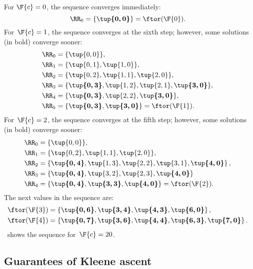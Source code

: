 \noindent For $\F{c}=0$, the sequence converges immediately:
\begin{equation*}
    \RR_{0}=\{\boldsymbol{\tup{ 0,0} }\}=\ftor(\F{0}).
\end{equation*}
For~$\F{c}=1$, the sequence converges at the sixth step; however, some solutions (in bold) converge sooner:
\begin{align*}
    \RR_{0} & =\{\tup{0,0} \}, \\
    \RR_{1} & =\{\tup{0,1},\tup{1,0}\}, \\
    \RR_{2} & =\{\tup{0,2},\tup{1,1}, \tup{2,0}\}, \\
    \RR_{3} & =\{\boldsymbol{\tup{0,3}},\tup{1,2}, \tup{2,1},\boldsymbol{\tup{3,0}}\}, \\
    \RR_{4} & =\{\boldsymbol{\tup{0,3}},\tup{2,2},\boldsymbol{\tup{3,0}}\}, \\
    \RR_{5} & =\{\boldsymbol{\tup{0,3}},\boldsymbol{\tup{3,0}}\}=\ftor(\F{1}).
\end{align*}
For~$\F{c}=2$, the sequence converges at the fifth step; however,
some solutions (in bold) converge sooner:
\begin{align*}
    \RR_{0} & =\{\tup{ 0,0} \}, \\
    \RR_{1} & =\{\tup{ 0,2} ,\tup{ 1,1} ,\tup{ 2,0} \}, \\
    \RR_{2} & =\left\{ \boldsymbol{\tup{ 0,4} }, \tup{1,3}, \tup{2,2}, \tup{3,1}, \boldsymbol{\tup{ 4,0} }\right\} , \\
    \RR_{3} & =\{\boldsymbol{\tup{0,4} },\tup{ 3,2}, \tup{2,3}, \boldsymbol{\tup{ 4,0} }\} \\
    \RR_{4} & =\{\boldsymbol{\tup{0,4} },\boldsymbol{\tup{ 3,3}},\boldsymbol{\tup{ 4,0} }\}=\ftor(\F{2}).
\end{align*}
The next values in the sequence are:
\begin{align*}
    \ftor(\F{3}) & =\left\{ \boldsymbol{\tup{ 0,6} },\boldsymbol{\tup{ 3,4} },\boldsymbol{\tup{ 4,3} },\boldsymbol{\tup{ 6,0} }\right\} , \\
    \ftor(\F{4}) & =\left\{ \boldsymbol{\tup{ 0,7} },\boldsymbol{\tup{ 3,6} },\boldsymbol{\tup{ 4,4} },\boldsymbol{\tup{ 6,3} },\boldsymbol{\tup{ 7,0} }\right\} .
\end{align*}
~shows the sequence for~$\F{c}=20$.

\subsection{Guarantees of Kleene ascent}

